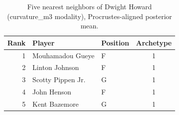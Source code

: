 \begin{table}[htbp]
  \centering\small
  \begin{tabular}{rllc}
    \toprule
    Rank & Player & Position & Archetype \\
    \midrule
    1 & Mouhamadou Gueye & F & 1 \\
    2 & Linton Johnson & F & 1 \\
    3 & Scotty Pippen Jr. & G & 1 \\
    4 & John Henson & F & 1 \\
    5 & Kent Bazemore & G & 1 \\
    \bottomrule
  \end{tabular}
  \caption{Five nearest neighbors of Dwight Howard (curvature_m3 modality), Procrustes-aligned posterior mean.}
  \label{tab:Dwight_Howard_neighbors_curvature_m3}
\end{table}

